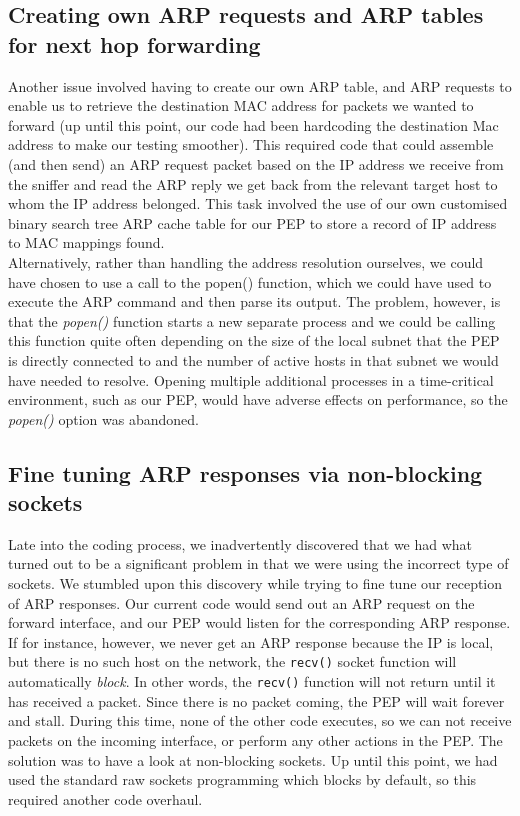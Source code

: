 \begin{appendices}
\subsection{Creating own ARP requests and ARP tables for next hop forwarding}
Another issue involved having to create our own ARP table, and ARP requests to enable us to retrieve the destination MAC address for packets we wanted to forward (up until this point, our code had been hardcoding the destination Mac address to make our testing smoother). This required code that could assemble (and then send) an ARP request packet based on the IP address we receive from the sniffer and read the ARP reply we get back from the relevant target host to whom the IP address belonged. This task involved the use of our own customised binary search tree ARP cache table for our PEP to store a record of IP address to MAC mappings found.  \\

Alternatively, rather than handling the address resolution ourselves, we could have chosen to use a call to the popen() function, which we could have used to execute the ARP command and then parse its output. The problem, however, is that the \emph{popen()} function starts a new separate process and we could be calling this function quite often depending on the size of the local subnet that the PEP is directly connected to and the number of active hosts in that subnet we would have needed to resolve. Opening multiple additional processes in a time-critical environment, such as our PEP, would have adverse effects on performance, so the \emph{popen()} option was abandoned. \\

\subsection{Fine tuning ARP responses via non-blocking sockets}

Late into the coding process, we inadvertently discovered that we had what turned out to be a significant problem in that we were using the incorrect type of sockets. We stumbled upon this discovery while trying to fine tune our reception of ARP responses. Our current code would send out an ARP request on the forward interface, and our PEP would listen for the corresponding ARP response. If for instance, however, we never get an ARP response because the IP is local, but there is no such host on the network, the {\tt recv()} socket function will automatically \emph{block}. In other words, the {\tt recv()} function will not return until it has received a packet. Since there is no packet coming, the PEP will wait forever and stall. During this time, none of the other code executes, so we can not receive packets on the incoming interface, or perform any other actions in the PEP. The solution was to have a look at non-blocking sockets. Up until this point, we had used the standard raw sockets programming which blocks by default, so this required another code overhaul. \\


\end{appendices}
